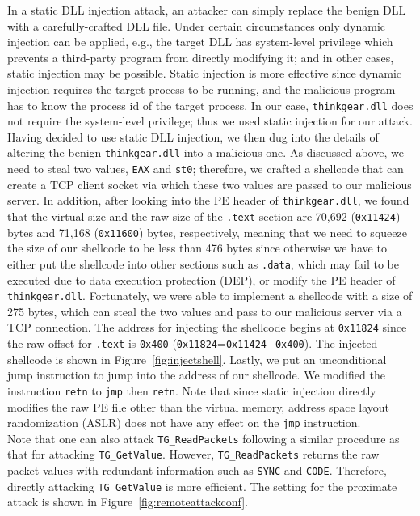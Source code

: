 In a static DLL injection attack, an attacker can simply replace the benign DLL with a carefully-crafted DLL file. Under certain circumstances only dynamic injection can be applied, e.g., the target DLL has system-level privilege which prevents a third-party program from directly modifying it; and in other cases, static injection may be possible. Static injection is more effective since dynamic injection requires the target process to be running, and the malicious program has to know the process id of the target process. In our case, \texttt{thinkgear.dll} does not require the system-level privilege; thus we used static injection for our attack.\\
%
\indent Having decided to use static DLL injection, we then dug into the details of altering the benign \texttt{thinkgear.dll} into a malicious one. As discussed above, we need to steal two values, \texttt{EAX} and \texttt{st0}; therefore, we crafted a shellcode that can create a TCP client socket via which these two values are passed to our malicious server. In addition, after looking into the PE header of \texttt{thinkgear.dll}, we found that the virtual size and the raw size of the \texttt{.text} section are 70,692 (\texttt{0x11424}) bytes and 71,168 (\texttt{0x11600}) bytes, respectively, meaning that we need to squeeze the size of our shellcode to be less than 476 bytes since otherwise we have to either put the shellcode into other sections such as \texttt{.data}, which may fail to be executed due to data execution protection (DEP), or modify the PE header of \texttt{thinkgear.dll}. Fortunately, we were able to implement a shellcode with a size of 275 bytes, which can steal the two values and pass to our malicious server via a TCP connection. The address for injecting the shellcode begins at \texttt{0x11824} since the raw offset for \texttt{.text} is \texttt{0x400} (\texttt{0x11824}=\texttt{0x11424}+\texttt{0x400}). The injected shellcode is shown in Figure~\ref{fig:injectshell}. Lastly, we put an unconditional jump instruction to jump into the address of our shellcode. We modified the instruction \texttt{retn} to \texttt{jmp} then \texttt{retn}. Note that since static injection directly modifies the raw PE file other than the virtual memory, address space layout randomization (ASLR) does not have any effect on the \texttt{jmp} instruction.\\
%
\indent Note that one can also attack \texttt{TG\_ReadPackets} following a similar procedure as that for attacking \texttt{TG\_GetValue}. However, \texttt{TG\_ReadPackets} returns the raw packet values with redundant information such as \texttt{SYNC} and \texttt{CODE}. Therefore, directly attacking \texttt{TG\_GetValue} is more efficient. The setting for the proximate attack is shown in Figure~\ref{fig:remoteattackconf}. 

